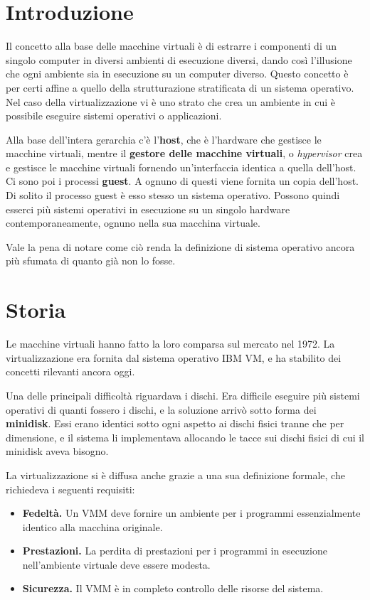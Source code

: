 \section{Introduzione}
    Il concetto alla base delle macchine virtuali è di estrarre i componenti di un singolo computer in diversi ambienti di esecuzione diversi, dando così l'illusione che ogni ambiente sia in esecuzione su un computer diverso. Questo concetto è per certi affine a quello della strutturazione stratificata di un sistema operativo. Nel caso della virtualizzazione vi è uno strato che crea un ambiente in cui è possibile eseguire sistemi operativi o applicazioni.
    
    Alla base dell'intera gerarchia c'è l'\textbf{host}, che è l'hardware che gestisce le macchine virtuali, mentre il \textbf{gestore delle macchine virtuali}, o \textit{hypervisor} crea e gestisce le macchine virtuali fornendo un'interfaccia identica a quella dell'host. Ci sono poi i processi \textbf{guest}. A ognuno di questi viene fornita un copia dell'host. Di solito il processo guest è esso stesso un sistema operativo. Possono quindi esserci più sistemi operativi in esecuzione su un singolo hardware contemporaneamente, ognuno nella sua macchina virtuale.
    
    Vale la pena di notare come ciò renda la definizione di sistema operativo ancora più sfumata di quanto già non lo fosse.
    
\section{Storia}
    Le macchine virtuali hanno fatto la loro comparsa sul mercato nel 1972. La virtualizzazione era fornita dal sistema operativo IBM VM, e ha stabilito dei concetti rilevanti ancora oggi.
    
    Una delle principali difficoltà riguardava i dischi. Era difficile eseguire più sistemi operativi di quanti fossero i dischi, e la soluzione arrivò sotto forma dei \textbf{minidisk}. Essi erano identici sotto ogni aspetto ai dischi fisici tranne che per dimensione, e il sistema li implementava allocando le tacce sui dischi fisici di cui il minidisk aveva bisogno.
    
    La virtualizzazione si è diffusa anche grazie a una sua definizione formale, che richiedeva i seguenti requisiti:
    \begin{itemize}
        \item \textbf{Fedeltà.} Un VMM deve fornire un ambiente per i programmi essenzialmente identico alla macchina originale.
        \item \textbf{Prestazioni.} La perdita di prestazioni per i programmi in esecuzione nell'ambiente virtuale deve essere modesta.
        \item \textbf{Sicurezza.} Il VMM è in completo controllo delle risorse del sistema.
    \end{itemize}
    
